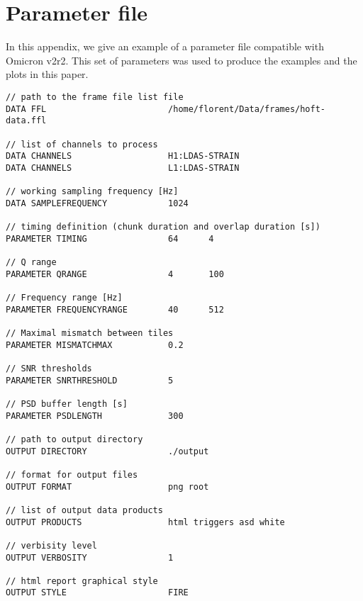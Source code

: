 \appendix
\section{Parameter file}\label{appx:parameters}
In this appendix, we give an example of a parameter file compatible with Omicron v2r2. This set of parameters was used to produce the examples and the plots in this paper.

\begin{verbatim}
// path to the frame file list file
DATA FFL                        /home/florent/Data/frames/hoft-data.ffl

// list of channels to process
DATA CHANNELS                   H1:LDAS-STRAIN
DATA CHANNELS                   L1:LDAS-STRAIN

// working sampling frequency [Hz]
DATA SAMPLEFREQUENCY            1024

// timing definition (chunk duration and overlap duration [s])
PARAMETER TIMING                64      4

// Q range
PARAMETER QRANGE                4       100

// Frequency range [Hz]
PARAMETER FREQUENCYRANGE        40      512

// Maximal mismatch between tiles
PARAMETER MISMATCHMAX           0.2

// SNR thresholds
PARAMETER SNRTHRESHOLD          5

// PSD buffer length [s]
PARAMETER PSDLENGTH             300

// path to output directory
OUTPUT DIRECTORY                ./output

// format for output files
OUTPUT FORMAT                   png root

// list of output data products
OUTPUT PRODUCTS                 html triggers asd white

// verbisity level
OUTPUT VERBOSITY                1

// html report graphical style
OUTPUT STYLE                    FIRE
\end{verbatim}
